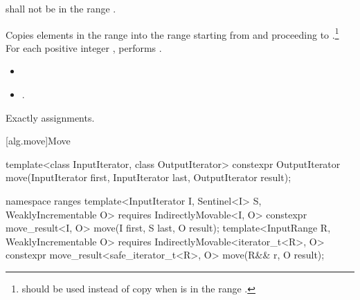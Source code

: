 \begin{itemdescr}
\pnum
\requires
{}
shall not be in the range
.

\pnum
\effects
Copies elements in the range 
into the
range 
starting from
and proceeding to .\footnote{
should be used instead of copy when 
is in
the range
.}
For each positive integer
,
performs
.

\pnum
\returns
\begin{itemize}
\item {}
\item {}.
\end{itemize}

\pnum
\complexity
Exactly
assignments.
\end{itemdescr}

[alg.move]{Move}

%
\begin{itemdecl}
template<class InputIterator, class OutputIterator>
  constexpr OutputIterator move(InputIterator first, InputIterator last,
                                OutputIterator result);
\end{itemdecl}
\begin{addedblock}
%
\begin{itemdecl}
namespace ranges {
  template<InputIterator I, Sentinel<I> S, WeaklyIncrementable O>
    requires IndirectlyMovable<I, O>
    constexpr move_result<I, O>
      move(I first, S last, O result);
  template<InputRange R, WeaklyIncrementable O>
    requires IndirectlyMovable<iterator_t<R>, O>
    constexpr move_result<safe_iterator_t<R>, O>
      move(R&& r, O result);
}
\end{itemdecl}
\end{addedblock}

